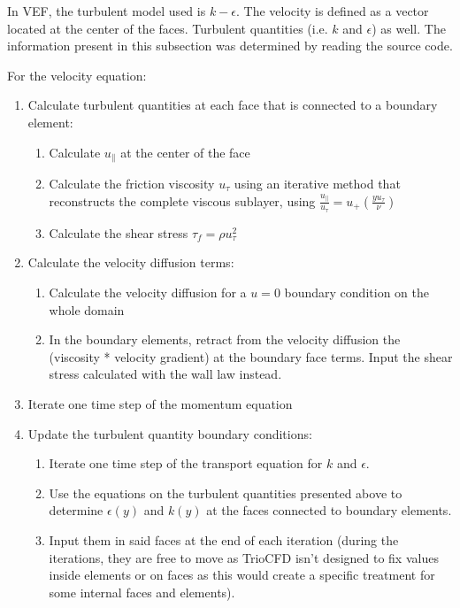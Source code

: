 In VEF, the turbulent model used is $k-\epsilon$. The velocity is defined as a vector located at the center of the faces. Turbulent quantities (i.e. $k$ and $\epsilon$) as well. The information present in this subsection was determined by reading the source code.

For the velocity equation:
\begin{enumerate}
\item Calculate turbulent quantities at each face that is connected to a boundary element:
\begin{enumerate}
	\item Calculate $u_\parallel$ at the center of the face
	\item Calculate the friction viscosity $u_\tau$ using an iterative method that reconstructs the complete viscous sublayer, using $\frac{u_\parallel}{u_\tau} = u_+(\frac{y u_\tau}{\nu})$
	\item Calculate the shear stress $\tau_f = \rho u_\tau^2$
\end{enumerate}

\item Calculate the velocity diffusion terms:
\begin{enumerate}	
	\item Calculate the velocity diffusion for a $u=0$ boundary condition on the whole domain
	\item In the boundary elements, retract from the velocity diffusion the (viscosity * velocity gradient)  at the boundary face terms. Input the shear stress calculated with the wall law instead.
\end{enumerate}

\item Iterate one time step of the momentum equation

\item Update the turbulent quantity boundary conditions:
\begin{enumerate}
	\item Iterate one time step of the transport equation for $k$ and $\epsilon$.
	\item Use the equations on the turbulent quantities presented above to determine $\epsilon(y)$ and $k(y)$ at the faces connected to boundary elements.
	\item Input them in said faces at the end of each iteration (during the iterations, they are free to move as TrioCFD isn't designed to fix values inside elements or on faces as this would create a specific treatment for some internal faces and elements).
\end{enumerate}
\end{enumerate}

